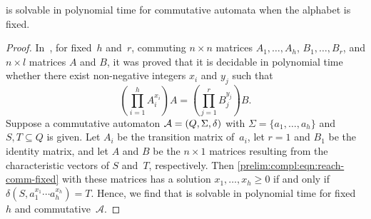 \begin{theorem} \label{prelim:compl:thm:reach-comm-fixed}
	\REACHF is solvable in polynomial time for commutative automata 
	when the alphabet is fixed.	
\end{theorem}
\begin{proof}
	In~\cite[Thm.~1.4]{DBLP:conf/soda/BabaiBCIL96}, for fixed~$h$ and~$r$,
	commuting $n \times n$ matrices $A_1, \ldots, A_h$,
	$B_1,\ldots, B_r$, and $n \times l$ matrices $A$ and $B$,
	it was proved that it is decidable in polynomial time whether
	there exist non-negative integers $x_i$ and $y_j$ such that
	\begin{equation} \label{prelim:compl:eqn:reach-comm-fixed}
		\left( \prod_{i=1}^h A_i^{x_i} \right)A 
		= 
		\left( \prod_{j=1}^r B_j^{y_j} \right)B.
	\end{equation}
	Suppose a commutative automaton $\mathcal A = (Q, \Sigma, \delta)$
	with $\Sigma = \{a_1, \ldots, a_h\}$
	and $S, T \subseteq Q$ is given.
	Let $A_i$ be the transition matrix of~$a_i$,
	let $r = 1$ and $B_1$ be the identity matrix,
	and let $A$ and $B$ be the $n \times 1$ matrices
	resulting from the characteristic vectors
	of $S$ and~$T$, respectively.
	Then  \cref{prelim:compl:eqn:reach-comm-fixed}
	with these matrices has a solution $x_1, \ldots, x_h \ge 0$ 
	if and only if $\delta(S, a_1^{x_1} \cdots a_h^{x_h}) = T$.
	Hence, 
	we find that \REACH 
	is solvable in polynomial time for fixed~$h$
	and commutative~$\mathcal A$.
\end{proof}